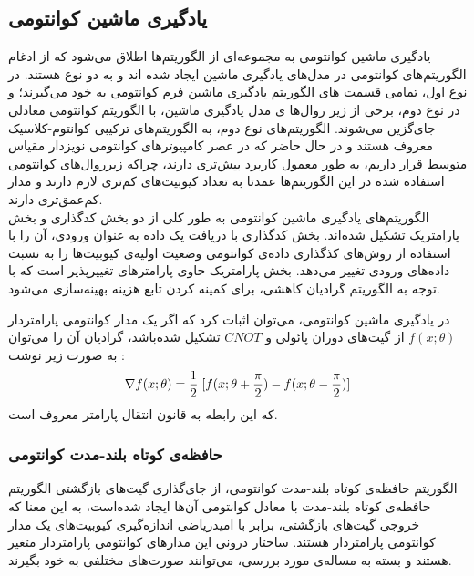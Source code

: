 \subsection{یادگیری ماشین کوانتومی}

یادگیری ماشین کوانتومی به مجموعه‌ای از الگوریتم‌ها اطلاق می‌شود که از ادغام الگوریتم‌های کوانتومی در مدل‌های یادگیری ماشین ایجاد شده ‌اند و به دو نوع هستند. در نوع اول، تمامی  قسمت ‌های الگوریتم یادگیری ماشین فرم کوانتومی به خود می‌گیرند؛ و در نوع دوم، برخی از زیر روال‌ها
ی مدل یادگیری ماشین، با الگوریتم کوانتومی معادلی جای‌گزین می‌شوند. الگوریتم‌های نوع دوم، به الگوریتم‌های ترکیبی کوانتوم-کلاسیک معروف هستند و در حال حاضر که در عصر
کامپیوترهای کوانتومی نویزدار مقیاس متوسط
قرار داریم، به طور معمول کاربرد بیش‌تری دارند، چراکه زیرروال‌های کوانتومی استفاده شده در این الگوریتم‌ها عمدتا به تعداد کیوبیت‌های کم‌تری لازم دارند و مدار کم‌عمق‌تری دارند. \\

الگوریتم‌های یادگیری ماشین کوانتومی به طور کلی از دو بخش کدگذاری
و بخش پارامتریک
تشکیل شده‌اند.
بخش کدگذاری با دریافت یک داده به عنوان ورودی، آن‌ را با استفاده از روش‌های کذگذاری داده‌ی کوانتومی
وضعیت اولیه‌ی کیوبیت‌ها را به نسبت داده‌های ورودی تغییر می‌دهد.
بخش پارامتریک حاوی پارامترهای تغییرپذیر است که با توجه به الگوریتم گرادیان کاهشی، برای کمینه کردن تابع هزینه بهینه‌سازی می‌شود.

در یادگیری ماشین کوانتومی، می‌توان اثبات کرد که اگر یک مدار کوانتومی پارامتردار
$f(x; \theta)$
از گیت‌های دوران پائولی و 
$CNOT$
تشکیل شده‌باشد، گرادیان آن را می‌توان به صورت زیر نوشت
\cite{Mitarai}:
\begin{equation}
    \nabla f(x; \theta) 
    = \frac{1}{2} \hspace{1mm} [f(x;\theta + \frac{\pi}{2}) - f(x; \theta - \frac{\pi}{2})]
\end{equation}
که این رابطه به قانون انتقال پارامتر
معروف است.

\subsubsection{حافظه‌ی کوتاه بلند-مدت کوانتومی} \label{sec:qlstm}
الگوریتم حافظه‌ی کوتاه بلند-مدت کوانتومی، از جای‌گذاری گیت‌های بازگشتی الگوریتم حافظه‌ی کوتاه بلند-مدت با معادل کوانتومی آن‌ها ایجاد شده‌است، به این معنا که خروجی گیت‌های بازگشتی، برابر با امیدریاضی اندازه‌گیری کیوبیت‌های یک مدار کوانتومی پارامتردار هستند. 
ساختار درونی این مدارهای کوانتومی پارامتردار متغیر هستند و بسته به مساله‌ی مورد بررسی، می‌توانند صورت‌های مختلفی به خود بگیرند.

